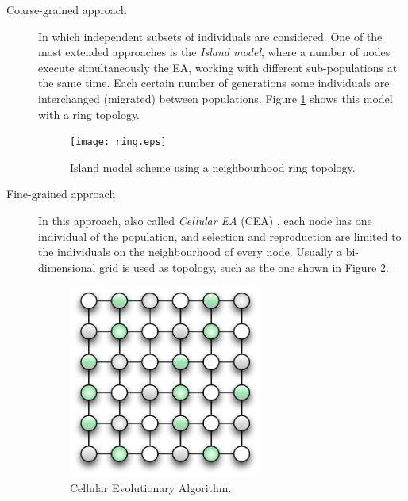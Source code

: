 \documentclass{article}
\begin{document}
\begin{description}
\item[Coarse-grained approach] In which independent subsets of individuals are considered. One of the most extended approaches is the \textit{Island model}, where a number of nodes execute simultaneously the EA, working with different sub-populations at the same time. Each certain number of generations some individuals are interchanged (migrated) between populations. Figure \ref{fig:ring} shows this model with a ring topology.

\begin{figure}[tb]
\centering
\texttt{[image: ring.eps]}
\caption{Island model scheme using a neighbourhood ring topology.}
\label{fig:ring}
\end{figure}

\item[Fine-grained approach] In this approach, also called \textit{Cellular EA} (CEA) \cite{alba-cellular-2008}, each node has one individual of the population, and selection and reproduction are limited to the individuals on the neighbourhood of every node. Usually a bi-dimensional grid is used as topology, such as the one shown in Figure \ref{fig:cellular}.

\begin{figure}[tb]
\centering
\includegraphics[width=15pc]{cellular.eps}
\caption{Cellular Evolutionary Algorithm.}
\label{fig:cellular}
\end{figure}

\end{description}
\end{document}
